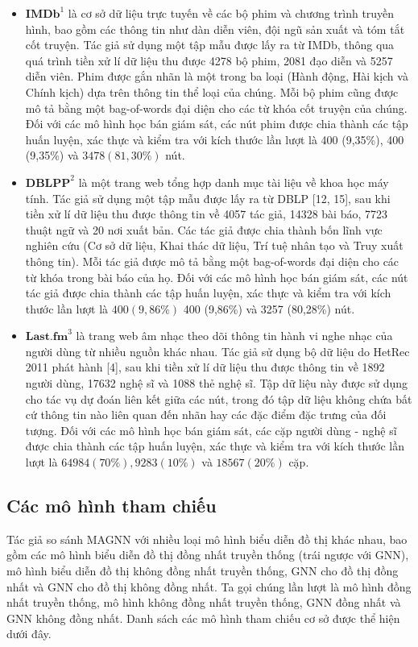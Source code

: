 \begin{itemize}
  \item $\mathbf{IMDb}^{1}$ là cơ sở dữ liệu trực tuyến về các bộ phim và chương trình truyền hình, bao gồm các thông tin như dàn diễn viên, đội ngũ sản xuất và tóm tắt cốt truyện. Tác giả sử dụng một tập mẫu được lấy ra từ IMDb, thông qua quá trình tiền xử lí dữ liệu thu được 4278 bộ phim, 2081 đạo diễn và 5257 diễn viên. Phim được gắn nhãn là một trong ba loại (Hành động, Hài kịch và Chính kịch) dựa trên thông tin thể loại của chúng. Mỗi bộ phim cũng được mô tả bằng một bag-of-words đại diện cho các từ khóa cốt truyện của chúng. Đối với các mô hình học bán giám sát, các nút phim được chia thành các tập huấn luyện, xác thực và kiểm tra với kích thước lần lượt là 400 (9,35\%), 400 (9,35\%) và $3478(81,30 \%)$ nút.
  \item $\mathbf{DBLPP}^{2}$ là một trang web tổng hợp danh mục tài liệu về khoa học máy tính. Tác giả sử dụng một tập mẫu được lấy ra từ DBLP [12, 15], sau khi tiền xử lí dữ liệu thu được thông tin về 4057 tác giả, 14328 bài báo, 7723 thuật ngữ và 20 nơi xuất bản. Các tác giả được chia thành bốn lĩnh vực nghiên cứu (Cơ sở dữ liệu, Khai thác dữ liệu, Trí tuệ nhân tạo và Truy xuất thông tin). Mỗi tác giả được mô tả bằng một bag-of-words đại diện cho các từ khóa trong bài báo của họ. Đối với các mô hình học bán giám sát, các nút tác giả được chia thành các tập huấn luyện, xác thực và kiểm tra với kích thước lần lượt là $400(9,86 \%)$ 400 (9,86\%) và 3257 (80,28\%) nút.
  \item $\mathbf{Last.fm}^{3}$ là trang web âm nhạc theo dõi thông tin hành vi nghe nhạc của người dùng từ nhiều nguồn khác nhau. Tác giả sử dụng bộ dữ liệu do HetRec 2011 phát hành [4], sau khi tiền xử lí dữ liệu thu được thông tin về 1892 người dùng, 17632 nghệ sĩ và 1088 thẻ nghệ sĩ. Tập dữ liệu này được sử dụng cho tác vụ dự đoán liên kết giữa các nút, trong đó tập dữ liệu không chứa bất cứ thông tin nào liên quan đến nhãn hay các đặc điểm đặc trưng của đối tượng. Đối với các mô hình học bán giám sát, các cặp người dùng - nghệ sĩ được chia thành các tập huấn luyện, xác thực và kiểm tra với kích thước lần lượt là $64984(70 \%), 9283(10 \%)$ và $18567(20 \%)$ cặp.
\end{itemize}

\subsection{Các mô hình tham chiếu}
Tác giả so sánh MAGNN với nhiều loại mô hình biểu diễn đồ thị khác nhau, bao gồm các mô hình biểu diễn đồ thị đồng nhất truyền thống (trái ngược với GNN), mô hình biểu diễn đồ thị không đồng nhất truyền thống, GNN cho đồ thị đồng nhất và GNN cho đồ thị không đồng nhất. Ta gọi chúng lần lượt là mô hình đồng nhất truyền thống, mô hình không đồng nhất truyền thống, GNN đồng nhất và GNN không đồng nhất. Danh sách các mô hình tham chiếu cơ sở được thể hiện dưới đây.

